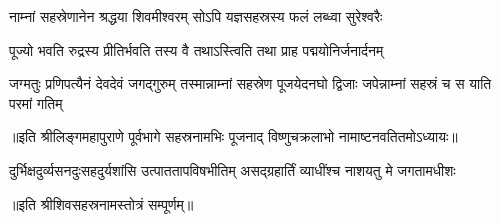 \twolineshloka
{नाम्नां सहस्रेणानेन श्रद्धया शिवमीश्वरम्}
{सोऽपि यज्ञसहस्रस्य फलं लब्ध्वा सुरेश्वरैः}%

\twolineshloka
{पूज्यो भवति रुद्रस्य प्रीतिर्भवति तस्य वै}
{तथाऽस्त्विति तथा प्राह पद्मयोनिर्जनार्दनम्}%

\threelineshloka
{जग्मतुः प्रणिपत्यैनं देवदेवं जगद्गुरुम्}
{तस्मान्नाम्नां सहस्रेण पूजयेदनघो द्विजाः}
{जपेन्नाम्नां सहस्रं च स याति परमां गतिम्}%

{॥इति श्रीलिङ्गमहापुराणे पूर्वभागे सहस्रनामभिः पूजनाद् विष्णुचक्रलाभो नामाष्टनवतितमोऽध्यायः॥}%

{दुर्भिक्षदुर्व्यसनदुःसहदुर्यशांसि}
{उत्पाततापविषभीतिम् असद्‌ग्रहार्तिं}
{व्याधींश्च नाशयतु मे जगतामधीशः}

॥इति श्रीशिवसहस्रनामस्तोत्रं सम्पूर्णम्॥

\hyperref[sec:start_ShivaSahasranamaStotram-VishnuKrtam]{\closesection}